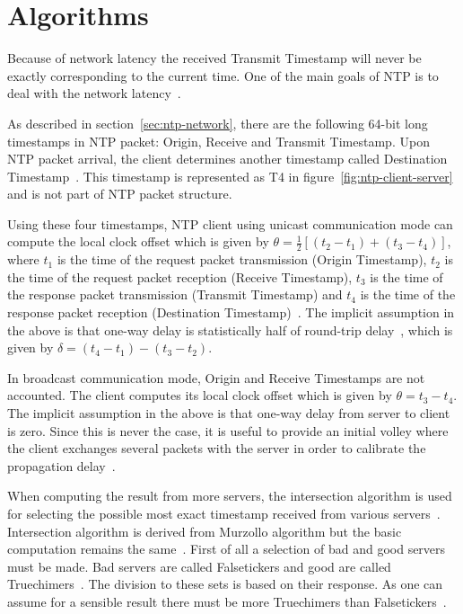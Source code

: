 
\section{Algorithms}\label{sec:ntp-algorithms}
Because of network latency the received Transmit Timestamp will never be exactly
corresponding to the current time.
One of the main goals of NTP is to deal with the network latency~\cite{ntp-overview}.

As described in section~\ref{sec:ntp-network},
there are the following 64-bit long timestamps in NTP packet: Origin, Receive and Transmit Timestamp.
Upon NTP packet arrival, the client determines another timestamp called
Destination Timestamp~\cite{rfc5905}.
This timestamp is represented as T4 in figure~\ref{fig:ntp-client-server}
and is not part of NTP packet structure.

Using these four timestamps, NTP client using unicast communication mode can compute
the local clock offset which is given by $\theta = \frac{1}{2}[(t_2 - t_1) + (t_3 - t_4)]$,
where $t_1$ is the time of the request packet transmission (Origin Timestamp),
$t_2$ is the time of the request packet reception (Receive Timestamp),
$t_3$ is the time of the response packet transmission (Transmit Timestamp) and
$t_4$ is the time of the response packet reception (Destination Timestamp)~\cite{ntp-algor,rfc5905}.
The implicit assumption in the above is that one-way delay is
statistically half of round-trip delay~\cite{rfc5905},
which is given by $\delta = (t_4 - t_1) - (t_3 - t_2)$.

In broadcast communication mode, Origin and Receive Timestamps are not accounted.
The client computes its local clock offset which is given by $\theta = t_3 - t_4$.
The implicit assumption in the above is that one-way delay from server to client is zero.
Since this is never the case, it is useful to provide an
initial volley where the client exchanges several packets with the server in
order to calibrate the propagation delay~\cite{rfc5905}.

When computing the result from more servers, the intersection algorithm is used
for selecting the possible most exact timestamp received from various servers~\cite{ntp-improved-algor,rfc5905}.
Intersection algorithm is derived from Murzollo algorithm but the basic
computation remains the same~\cite{ntp-history}.
First of all a selection of bad and good servers must be made.
Bad servers are called Falsetickers and good are called Truechimers~\cite{rfc5905}.
The division to these sets is based on their response.
As one can assume for a sensible result there must be more Truechimers than Falsetickers~\cite{rfc5905}.

